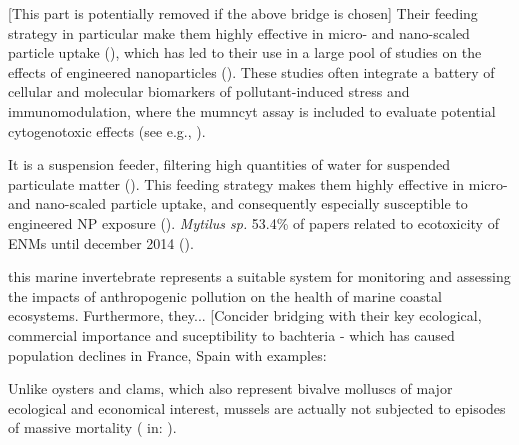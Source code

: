 \begin{table}[h!]
\centering
	\caption{Bla bla}
	\label{tb:linmod}
\end{table}


[This part is potentially removed if the above bridge is chosen] Their feeding strategy in particular make them highly effective in micro- and nano-scaled particle uptake (\cite{Canesi2012}), which has led to their use in a large pool of studies on the effects of engineered nanoparticles (\cite{Rocha2015}). These studies often integrate a battery of cellular and molecular biomarkers of pollutant-induced stress and immunomodulation, where the \acrshort{mumncyt} assay is included to evaluate potential cytogenotoxic effects (see e.g., \cite{Rocha2014, Ruiz2015}).

It is a suspension feeder, filtering high quantities of water for suspended particulate matter (\cite{Beyer2017b}). This feeding strategy makes them highly effective in micro- and nano-scaled particle uptake, and consequently especially susceptible to engineered NP exposure (\cite{Canesi2012}). \emph{Mytilus sp.} 53.4\% of papers related to ecotoxicity of ENMs until december 2014 (\cite{Rocha2015}).

this marine invertebrate represents a suitable system for monitoring and assessing the impacts of anthropogenic pollution on the health of marine coastal ecosystems. Furthermore, they... [Concider bridging with their key ecological, commercial importance and suceptibility to bachteria - which has caused population declines in France, Spain with examples: 

Unlike oysters and clams, which also represent bivalve molluscs of major ecological and economical interest, mussels are actually not subjected to episodes of massive mortality (\cite{Costa2009} in: \cite{Rioult2014}).

